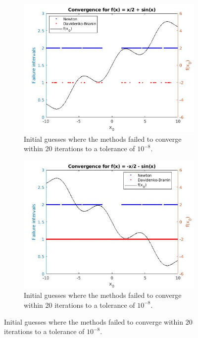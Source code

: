 \documentclass{book}
\begin{document}
\begin{figure}
	\begin{subfigure}{0.5\textwidth}
		\includegraphics[width=\textwidth]{DB01.jpg}
		\caption{Initial guesses where the methods failed to converge within 20 iterations to a tolerance of $10^{-8}$.}
		\label{fig:DBM1}
	\end{subfigure}
	\begin{subfigure}{0.5\textwidth}
		\includegraphics[width=\textwidth]{DB02.jpg}
		\caption{Initial guesses where the methods failed to converge within 20 iterations to a tolerance of $10^{-8}$.}
		\label{fig:DBM2}
	\end{subfigure}
\end{figure}
\end{document}

